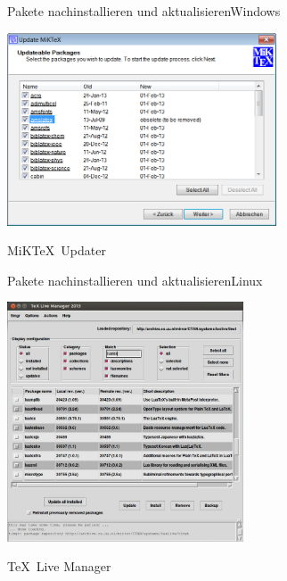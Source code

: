 \begin{Frame}{Pakete nachinstallieren und aktualisieren}{Windows}
  \begin{minipage}{\textwidth}\begin{center}
    \includegraphics[width=8cm]{images/miktex-update}

    MiK\TeX\ Updater
  \end{center}\end{minipage}
\end{Frame}

\begin{Frame}{Pakete nachinstallieren und aktualisieren}{Linux}
  \begin{minipage}{\textwidth}\begin{center}
    \includegraphics[width=7cm]{images/texlive-update}

    \TeX\ Live Manager
  \end{center}\end{minipage}
\end{Frame}

